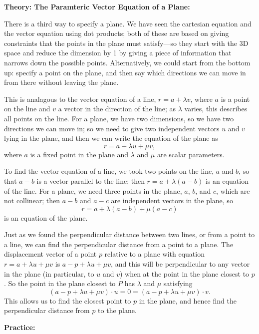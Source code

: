 \documentclass{article}
\begin{document}
\textbf{Theory: The Paramteric Vector Equation of a Plane:}\bigskip

There is a third way to specify a plane. We have seen the cartesian equation and the vector equation using dot products; both of these are based on giving constraints that the points in the plane must satisfy---so they start with the 3D space and reduce the dimension by 1 by giving a piece of information that narrows down the possible points. Alternatively, we could start from the bottom up: specify a point on the plane, and then say which directions we can move in from there without leaving the plane.

This is analagous to the vector equation of a line, $r=a+\lambda v$, where $a$ is a point on the line and $v$ a vector in the direction of the line; as $\lambda$ varies, this describes all points on the line. For a plane, we have two dimensions, so we have two directions we can move in; so we need to give two independent vectors $u$ and $v$ lying in the plane, and then we can write the equation of the plane as
\[r=a+\lambda u+\mu v,\]
where $a$ is a fixed point in the plane and $\lambda$ and $\mu$ are scalar parameters.

To find the vector equation of a line, we took two points on the line, $a$ and $b$, so that $a-b$ is a vector parallel to the line; then $r=a+\lambda(a-b)$ is an equation of the line. For a plane, we need three points in the plane, $a$, $b$, and $c$, which are not collinear; then $a-b$ and $a-c$ are independent vectors in the plane, so
\[r=a+\lambda(a-b)+\mu(a-c)\]
is an equation of the plane.\bigskip


Just as we found the perpendicular distance between two lines, or from a point to a line, we can find the perpendicular distance from a point to a plane. The displacement vector of a point $p$ relative to a plane with equation $r=a+\lambda u+\mu v$ is $a-p+\lambda u + \mu v$, and this will be perpendicular to any vector in the plane (in particular, to $u$ and $v$) when at the point in the plane closest to $p$. So the point in the plane closest to $P$ has $\lambda$ and $\mu$ satisfying
\[(a-p+\lambda u+\mu v)\cdot u=0=(a-p+\lambda u+\mu v)\cdot v.\]
This allows us to find the closest point to $p$ in the plane, and hence find the perpendicular distance from $p$ to the plane.


\clearpage


\textbf{Practice:}\bigskip
\end{document}
